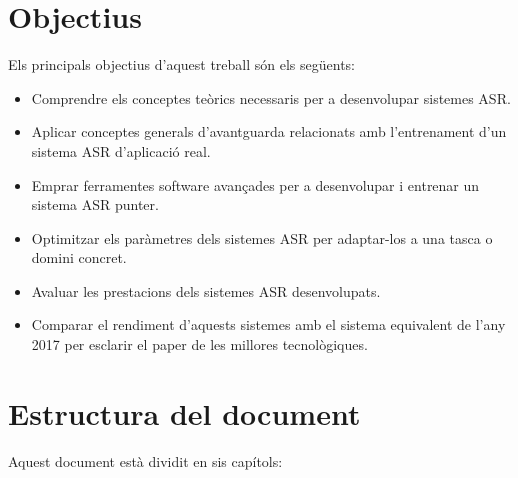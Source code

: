\section{Objectius}
\label{cap01_objectius}

Els principals objectius d'aquest treball són els següents:

\begin{itemize}
    \item Comprendre els conceptes teòrics necessaris per a desenvolupar sistemes ASR.

    \item Aplicar conceptes generals d'avantguarda relacionats amb l'entrenament d'un sistema ASR d'aplicació real.
    
    \item Emprar ferramentes software avançades per a desenvolupar i entrenar un sistema ASR punter.
    
    \item Optimitzar els paràmetres dels sistemes ASR per adaptar-los a una tasca o domini concret.
    
    \item Avaluar les prestacions dels sistemes ASR desenvolupats.
    
    \item Comparar el rendiment d'aquests sistemes amb el sistema equivalent de l'any 2017 per esclarir el paper de les millores tecnològiques.

\end{itemize}

\section{Estructura del document}
\label{cap01_estructura_doc}

Aquest document està dividit en sis capítols:

